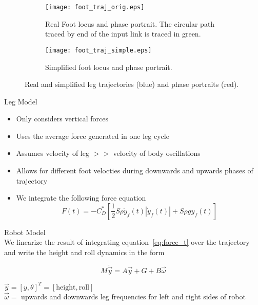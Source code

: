 \begin{minipage}{0.95\columnwidth}
\begin{figure}[tb]
\centering
\begin{subfigure}[t]{0.47\textwidth}
    \centering
    \texttt{[image: foot\_traj\_orig.eps]}
    \caption{Real Foot locus and phase portrait. The circular path traced by end of the input link is traced in green.} 
    \label{fig:trajrob}
\end{subfigure}
\quad
\begin{subfigure}[t]{0.47\textwidth}
    \centering
    \texttt{[image: foot\_traj\_simple.eps]}
    \caption{Simplified foot locus and phase portrait.} 
    \label{fig:trajsimp}
\end{subfigure}
\caption{Real and simplified leg trajectories (blue) and phase portraits (red).}
\label{fig:traj}
\end{figure}
\end{minipage}
\vspace{1EX}

\textcolor{prime}{\textsf{Leg Model}}
\begin{itemize}
    \item Only considers vertical forces
    \item Uses the average force generated in one leg cycle
    \item Assumes velocity of leg $>>$ velocity of body oscillations
    \item Allows for different foot velocties during downwards and upwards phases of trajectory
    \item We integrate the following force equation~\cite{glasheen1996vertical}
        \begin{equation}
            F(t) = - C_D^* \left[\frac{1}{2} S \rho \dot{y}_f(t) |\dot{y}_f(t) | + S \rho g y_f(t) \right]
            \label{eq:force_t}
        \end{equation}
\end{itemize}

\textcolor{prime}{\textsf{Robot Model}} \\
We linearize the result of integrating equation~\ref{eq:force_t} over the trajectory and write the height and roll dynamics in the form

\begin{equation}
    M \ddot{\vec{y}} = A \vec{y} + G + B \vec{\omega} 
    \label{eq:rob_dyn}
\end{equation}

$\vec{y} = [y, \theta]^T =  [\textrm{height}, \textrm{roll}]$\\
$\vec{\omega} = $ upwards and downwards leg frequencies for left and right sides of robot
